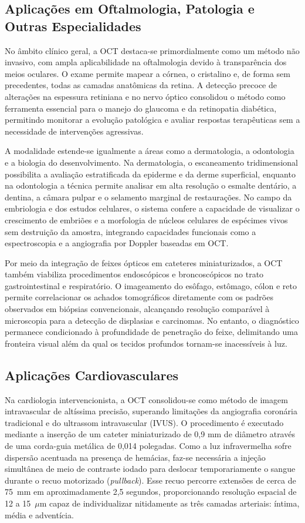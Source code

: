 \documentclass[a4paper,12pt,oneside,openright]{abntex2}
\begin{document}
\subsection{Aplicações em Oftalmologia, Patologia e Outras Especialidades}

No âmbito clínico geral, a OCT destaca-se primordialmente como um método não invasivo, com ampla aplicabilidade na oftalmologia devido à transparência dos meios oculares. O exame permite mapear a córnea, o cristalino e, de forma sem precedentes, todas as camadas anatômicas da retina. A detecção precoce de alterações na espessura retiniana e no nervo óptico consolidou o método como ferramenta essencial para o manejo do glaucoma e da retinopatia diabética, permitindo monitorar a evolução patológica e avaliar respostas terapêuticas sem a necessidade de intervenções agressivas.

A modalidade estende-se igualmente a áreas como a dermatologia, a odontologia e a biologia do desenvolvimento. Na dermatologia, o escaneamento tridimensional possibilita a avaliação estratificada da epiderme e da derme superficial, enquanto na odontologia a técnica permite analisar em alta resolução o esmalte dentário, a dentina, a câmara pulpar e o selamento marginal de restaurações. No campo da embriologia e dos estudos celulares, o sistema confere a capacidade de visualizar o crescimento de embriões e a morfologia de núcleos celulares de espécimes vivos sem destruição da amostra, integrando capacidades funcionais como a espectroscopia e a angiografia por Doppler baseadas em OCT.

Por meio da integração de feixes ópticos em cateteres miniaturizados, a OCT também viabiliza procedimentos endoscópicos e broncoscópicos no trato gastrointestinal e respiratório. O imageamento do esôfago, estômago, cólon e reto permite correlacionar os achados tomográficos diretamente com os padrões observados em biópsias convencionais, alcançando resolução comparável à microscopia para a detecção de displasias e carcinomas. No entanto, o diagnóstico permanece condicionado à profundidade de penetração do feixe, delimitando uma fronteira visual além da qual os tecidos profundos tornam-se inacessíveis à luz.

\subsection{Aplicações Cardiovasculares}

Na cardiologia intervencionista, a OCT consolidou-se como método de imagem intravascular de altíssima precisão, superando limitações da angiografia coronária tradicional e do ultrassom intravascular (IVUS). O procedimento é executado mediante a inserção de um cateter miniaturizado de 0,9 mm de diâmetro através de uma corda-guia metálica de 0,014 polegadas. Como a luz infravermelha sofre dispersão acentuada na presença de hemácias, faz-se necessária a injeção simultânea de meio de contraste iodado para deslocar temporariamente o sangue durante o recuo motorizado (\textit{pullback}). Esse recuo percorre extensões de cerca de 75~mm em aproximadamente 2,5 segundos, proporcionando resolução espacial de 12 a 15~$\mu$m capaz de individualizar nitidamente as três camadas arteriais: íntima, média e adventícia.
\end{document}

